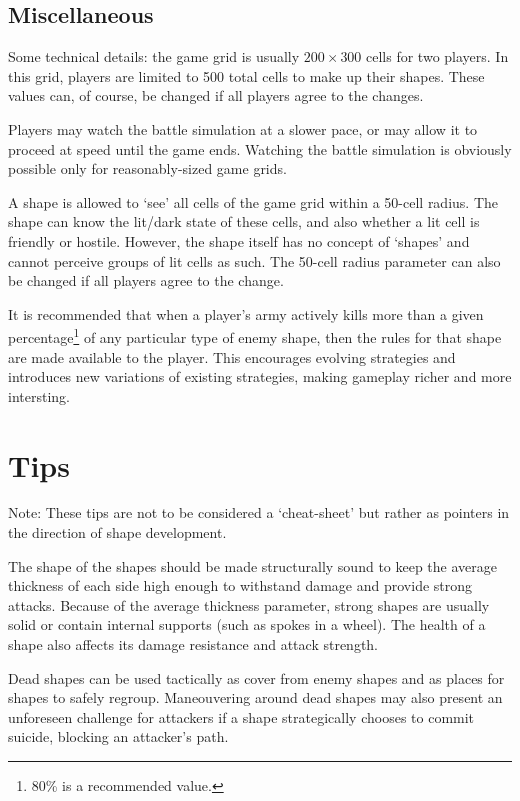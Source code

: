 \documentclass[a4paper,11pt]{article}
\begin{document}
\subsection{Miscellaneous}

Some technical details: the game grid is usually \(200 \times 300\) cells for two players. In this grid, players are limited to 500 total cells to make up their shapes. These values can, of course, be changed if all players agree to the changes.

Players may watch the battle simulation at a slower pace, or may allow it to proceed at speed until the game ends. Watching the battle simulation is obviously possible only for reasonably-sized game grids.

A shape is allowed to `see' all cells of the game grid within a 50-cell radius. The shape can know the lit/dark state of these cells, and also whether a lit cell is friendly or hostile. However, the shape itself has no concept of `shapes' and cannot perceive groups of lit cells as such. The 50-cell radius parameter can also be changed if all players agree to the change.

It is recommended that when a player's army actively kills more than a given percentage\footnote{80\% is a recommended value.} of any particular type of enemy shape, then the rules for that shape are made available to the player. This encourages evolving strategies and introduces new variations of existing strategies, making gameplay richer and more intersting.


\newpage
\section{Tips}

Note: These tips are not to be considered a `cheat-sheet' but rather as pointers in the direction of shape development.

The shape of the shapes should be made structurally sound to keep the average thickness of each side high enough to withstand damage and provide strong attacks. Because of the average thickness parameter, strong shapes are usually solid or contain internal supports (such as spokes in a wheel). The health of a shape also affects its damage resistance and attack strength.

Dead shapes can be used tactically as cover from enemy shapes and as places for shapes to safely regroup. Maneouvering around dead shapes may also present an unforeseen challenge for attackers if a shape strategically chooses to commit suicide, blocking an attacker's path.
\end{document}
